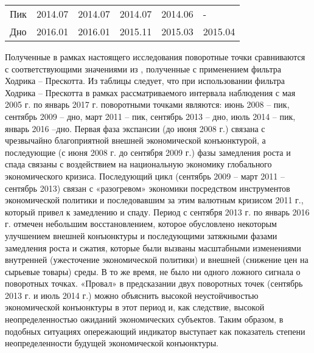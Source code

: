 \documentclass[a4paper,14pt]{extreport}
\begin{document}
\begin{table}[]
\begin{tabular}{l|l|l|l|l|l}
			Пик                                                                                                  & 2014.07                                                                                                                   & 2014.07                                                                    & 2014.07                                                                          & 2014.06                                                                   & -                                                                               \\
			Дно                                                                                                  & 2016.01                                                                                                                   & 2016.01                                                                    & 2015.11                                                                          & 2015.03                                                                   & 2015.04                                                                        
		\end{tabular}
	\end{table}
	
	Полученные в рамках настоящего исследования поворотные точки сравниваются с соответствующими значениями из \cite{esiMakingAlt}, полученные с применением фильтра Ходрика – Прескотта. Из таблицы следует, что при использовании фильтра Ходрика – Прескотта  в   рамках рассматриваемого интервала наблюдения с мая 2005 г. по январь 2017 г. поворотными точками являются: июнь 2008 – пик, сентябрь 2009 – дно, март 2011 – пик, сентябрь 2013 – дно, июль 2014 – пик, январь 2016 –дно. Первая фаза экспансии (до июня 2008 г.) связана с чрезвычайно благоприятной внешней экономической конъюнктурой, а последующие (с июня 2008 г. до сентября 2009 г.) фазы замедления роста и спада связаны с воздействием на национальную экономику глобального экономического кризиса. Последующий цикл (сентябрь 2009 – март 2011 – сентябрь 2013) связан с «разогревом» экономики посредством инструментов экономической политики и последовавшим за этим валютным кризисом 2011 г., который привел к замедлению и спаду. Период с сентября 2013 г. по январь 2016 г. отмечен небольшим восстановлением, которое обусловлено некоторым улучшением внешней конъюнктуры и последующими затяжными фазами замедления роста и сжатия, которые были вызваны масштабными изменениями внутренней (ужесточение экономической политики) и внешней (снижение цен на сырьевые товары) среды. В то же время, не было ни одного ложного сигнала о поворотных точках. «Провал» в предсказании двух поворотных точек (сентябрь 2013 г. и июль 2014 г.) можно объяснить высокой неустойчивостью экономической конъюнктуры в этот период и, как следствие, высокой неопределенностью ожиданий экономических субъектов. Таким образом, в подобных ситуациях опережающий индикатор выступает как показатель степени неопределенности будущей экономической конъюнктуры.
	
\end{document}
